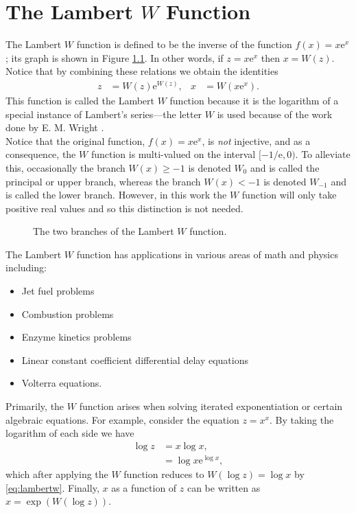
\chapter{The Lambert $W$ Function}
\label{chap:lambertw}
The Lambert $W$ function is defined to be the inverse of the function $f(x) = x \textrm{e}^x$; its graph is shown in Figure \ref{fig:lambertw}. In other words, if $z = x \textrm{e}^x$ then $x = W(z)$. Notice that by combining these relations we obtain the identities
\begin{align}
\label{eq:lambertw}
z &= W(z) \textrm{e}^{W(z)}, & x &= W(x \textrm{e}^x).
\end{align}
This function is called the Lambert $W$ function because it is the logarithm of a special instance of Lambert's series---the letter $W$ is used because of the work done by E. M. Wright \cite{corless}. \\

Notice that the original function, $f(x) = x \textrm{e}^x$, is \emph{not} injective, and as a consequence, the $W$ function is multi-valued on the interval $[-1/\textrm{e},0)$. To alleviate this, occasionally the branch $W(x) \geq -1$ is denoted $W_0$ and is called the principal or upper branch, whereas the branch $W(x) < -1$ is denoted $W_{-1}$ and is called the lower branch. However, in this work the $W$ function will only take positive real values and so this distinction is not needed. \\

\begin{figure}[htbp]
\centering

\caption{The two branches of the Lambert $W$ function.}
\label{fig:lambertw}
\end{figure}

The Lambert $W$ function has applications in various areas of math and physics \cite{corless} including:
\begin{itemize}
\item Jet fuel problems
\item Combustion problems
\item Enzyme kinetics problems
\item Linear constant coefficient differential delay equations
\item Volterra equations.
\end{itemize}
Primarily, the $W$ function arises when solving iterated exponentiation or certain algebraic equations. For example, consider the equation $z = x^x$. By taking the logarithm of each side we have
\begin{align*}
\log z &= x \log x, \\
&= \log x \textrm{e}^{\log x},
\end{align*}
which after applying the $W$ function reduces to $W(\log z) = \log x$ by \eqref{eq:lambertw}. Finally, $x$ as a function of $z$ can be written as $x = \exp(W(\log z))$.


